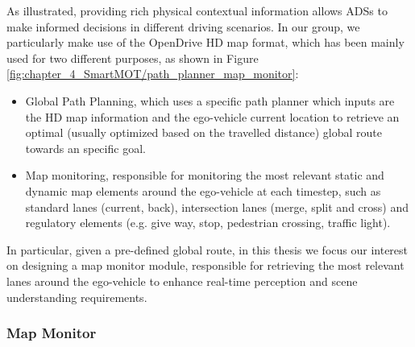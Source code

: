 As illustrated, providing rich physical contextual information allows \acp{ADS} to make informed decisions in different driving scenarios. In our group, we particularly make use of the OpenDrive \cite{dupuis2010opendrive} HD map format, which has been mainly used for two different purposes, as shown in Figure \ref{fig:chapter_4_SmartMOT/path_planner_map_monitor}:

\begin{itemize}
	\item Global Path Planning, which uses a specific path planner which inputs are the HD map information and the ego-vehicle current location to retrieve an optimal (usually optimized based on the travelled distance) global route towards an specific goal.
	\item Map monitoring, responsible for monitoring the most relevant static and dynamic map elements around the ego-vehicle at each timestep, such as standard lanes (current, back), intersection lanes (merge, split and cross) and regulatory elements (e.g. give way, stop, pedestrian crossing, traffic light).
\end{itemize}

In particular, given a pre-defined global route, in this thesis we focus our interest on designing a map monitor module, responsible for retrieving the most relevant lanes around the ego-vehicle to enhance real-time perception and scene understanding requirements.

\subsubsection{Map Monitor}
\label{subsubsec:4_smartmot_mapmonitor}


